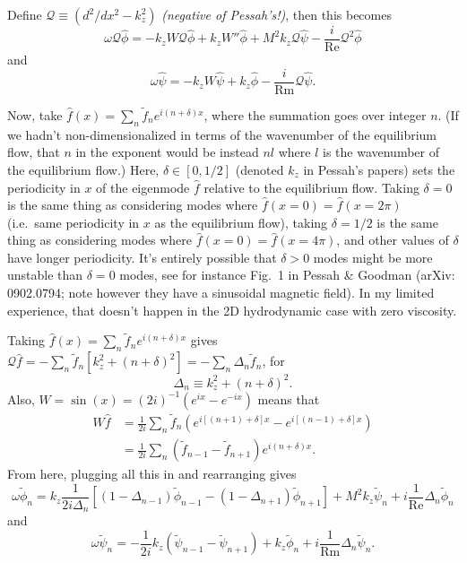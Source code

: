 \documentclass[aps,pop,preprint]{revtex4}
\begin{document}
	Define $\mathcal{Q} \equiv (d^2/dx^2 - k_z^2)$ \emph{(negative of Pessah's!)}, then this becomes
	\begin{equation}
	\omega \mathcal{Q} \hat{\phi} = -k_z W \mathcal{Q} \hat{\phi} + k_z W'' \hat{\phi}+ M^2 k_z \mathcal{Q} \hat{\psi} - \frac{i}{\mathrm{Re}}\mathcal{Q}^2\hat{\phi}
	\end{equation}
	and
	\begin{equation}
	\omega \hat{\psi} = -k_z W \hat{\psi} + k_z \hat{\phi} - \frac{i}{\mathrm{Rm}}\mathcal{Q}\hat{\psi}.
	\end{equation}
	
	Now, take $\hat{f}(x) = \sum_n \tilde{f}_n e^{i(n + \delta)x}$, where the summation goes over integer $n$. 
	(If we hadn't non-dimensionalized in terms of the wavenumber of the equilibrium flow, that $n$ in the exponent would be instead $nl$ where $l$ is the wavenumber of the equilibrium flow.) 
	Here, $\delta \in [0, 1/2]$ (denoted $k_z$ in Pessah's papers) sets the periodicity in $x$ of the eigenmode $\hat{f}$ relative to the equilibrium flow. 
	Taking $\delta = 0$ is the same thing as considering modes where $\hat{f}(x=0) = \hat{f}(x = 2\pi)$ (i.e.~same periodicity in $x$ as the equilibrium flow), taking $\delta = 1/2$ is the same thing as considering modes where $\hat{f}(x=0) = \hat{f}(x = 4\pi)$, and other values of $\delta$ have longer periodicity. 
	It's entirely possible that $\delta>0$ modes might be more unstable than $\delta = 0$ modes, see for instance Fig.~1 in Pessah \& Goodman (arXiv: 0902.0794; note however they have a sinusoidal magnetic field). 
	In my limited experience, that doesn't happen in the 2D hydrodynamic case with zero viscosity. 
	
	Taking $\hat{f}(x) = \sum_n \tilde{f}_n e^{i(n + \delta)x}$ gives $\mathcal{Q}\hat{f} = - \sum_n \tilde{f}_n [k_z^2 + (n+\delta)^2] = - \sum_n \Delta_n \tilde{f}_n$, for
	\begin{equation}
	\Delta_n \equiv k_z^2 + (n + \delta)^2.
	\end{equation}
	Also, $W = \sin(x) = (2 i)^{-1}(e^{ix} - e^{-ix})$ means that
	\begin{equation}
	\begin{split}
	W\hat{f} &= \frac{1}{2i} \sum_n \tilde{f}_n \left( e^{i[(n+1) + \delta]x} - e^{i[(n-1) + \delta]x} \right)\\
	&= \frac{1}{2i} \sum_n \left(\tilde{f}_{n-1} - \tilde{f}_{n+1}\right) e^{i(n + \delta)x}.
	\end{split}
	\end{equation}
	From here, plugging all this in and rearranging gives
	\begin{equation}
	\omega \tilde{\phi}_n = k_z \frac{1}{2 i \Delta_n}\left[(1 - \Delta_{n-1}) \tilde{\phi}_{n-1} - (1 - \Delta_{n+1})\tilde{\phi}_{n+1}\right] + M^2 k_z \tilde{\psi}_n + i \frac{1}{\mathrm{Re}} \Delta_n \tilde{\phi}_n
	\end{equation}
	and
	\begin{equation}
	\omega \tilde{\psi}_n = - \frac{1}{2i} k_z \left( \tilde{\psi}_{n-1} - \tilde{\psi}_{n+1} \right) + k_z \tilde{\phi}_n + i\frac{1}{\mathrm{Rm}}\Delta_n \tilde{\psi}_n.
	\end{equation}
	
\end{document}
